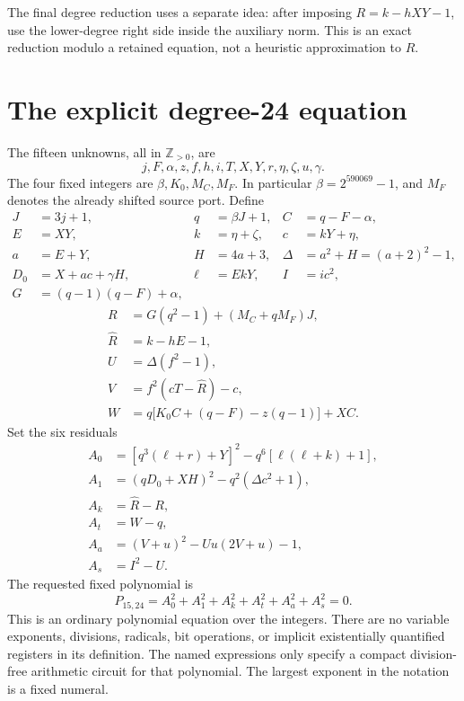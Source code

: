 \documentclass[11pt,a4paper]{article}
\theoremstyle{remark}
\newcommand{\Zp}{\mathbb Z_{>0}}
\newcommand{\Ptwo}{P_{15,24}}
\begin{document}
The final degree reduction uses a separate idea: after imposing
$R=k-hXY-1$, use the lower-degree right side inside the auxiliary norm.
This is an exact reduction modulo a retained equation, not a heuristic
approximation to $R$.

\clearpage
\section{The explicit degree-24 equation}
\label{sec:formula}

The fifteen unknowns, all in $\Zp$, are
\[
 j,F,\alpha,z,f,h,i,T,X,Y,r,\eta,\zeta,u,\gamma.
\]
The four fixed integers are $\beta,K_0,M_C,M_F$. In particular
$\beta=2^{590069}-1$, and $M_F$ denotes the already shifted source port.
Define
\begin{align*}
 J&=3j+1,&q&=\beta J+1,&C&=q-F-\alpha,\\
 E&=XY,&k&=\eta+\zeta,&c&=kY+\eta,\\
 a&=E+Y,&H&=4a+3,&\Delta&=a^2+H=(a+2)^2-1,\\
 D_0&=X+ac+\gamma H,&\ell&=EkY,&I&=ic^2,\\
 G&=(q-1)(q-F)+\alpha,&&&
\end{align*}
\begin{align*}
 R&=G(q^2-1)+(M_C+qM_F)J,\\
 \widehat R&=k-hE-1,\\
 U&=\Delta(f^2-1),\\
 V&=f^2(cT-\widehat R)-c,\\
 W&=q\bigl[K_0C+(q-F)-z(q-1)\bigr]+XC.
\end{align*}
Set the six residuals
\begin{align}
 A_0&=[q^3(\ell+r)+Y]^2-q^6[\ell(\ell+k)+1],\label{eq:first}\\
 A_1&=(qD_0+XH)^2-q^2(\Delta c^2+1),\label{eq:main}\\
 A_k&=\widehat R-R,\label{eq:index}\\
 A_t&=W-q,\label{eq:transport}\\
 A_a&=(V+u)^2-Uu(2V+u)-1,\label{eq:aux}\\
 A_s&=I^2-U.\label{eq:strong}
\end{align}
The requested fixed polynomial is
\begin{equation}
 \boxed{\Ptwo=A_0^2+A_1^2+A_k^2+A_t^2+A_a^2+A_s^2=0.}
 \label{eq:p24}
\end{equation}
This is an ordinary polynomial equation over the integers. There are no
variable exponents, divisions, radicals, bit operations, or implicit
existentially quantified registers in its definition. The named expressions
only specify a compact division-free arithmetic circuit for that polynomial.
The largest exponent in the notation is a fixed numeral.
\end{document}
